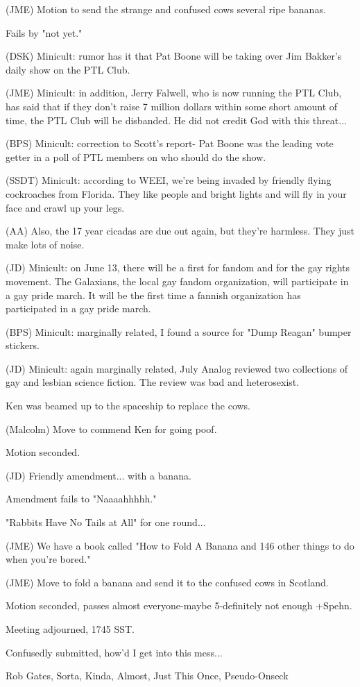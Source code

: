 \documentclass[12pt]{article}
\begin{document}
(JME) Motion to send the strange and confused cows several ripe bananas.

Fails by "not yet."

(DSK) Minicult: rumor has it that Pat Boone will be taking over Jim Bakker's daily show on the PTL Club.

(JME) Minicult: in addition, Jerry Falwell, who is now running the PTL Club, has said that if they don't raise 7 million dollars within some short amount of time, the PTL Club will be disbanded. He did not credit God with this threat...

(BPS) Minicult: correction to Scott's report- Pat Boone was the leading vote getter in a poll of PTL members on who should do the show.

(SSDT) Minicult: according to WEEI, we're being invaded by friendly flying cockroaches from Florida. They like people and bright lights and will fly in your face and crawl up your legs.

(AA) Also, the 17 year cicadas are due out again, but they're harmless. They just make lots of noise.

(JD) Minicult: on June 13, there will be a first for fandom and for the gay rights movement. The Galaxians, the local gay fandom organization, will participate in a gay pride march. It will be the first time a fannish organization has participated in a gay pride march.

(BPS) Minicult: marginally related, I found a source for "Dump Reagan" bumper stickers.

(JD) Minicult: again marginally related, July Analog reviewed two collections of gay and lesbian science fiction. The review was bad and heterosexist.

Ken was beamed up to the spaceship to replace the cows.

(Malcolm) Move to commend Ken for going poof.

Motion seconded.

(JD) Friendly amendment... with a banana.

Amendment fails to "Naaaahhhhh."

"Rabbits Have No Tails at All" for one round...

(JME) We have a book called "How to Fold A Banana and 146 other things to do when you're bored."

(JME) Move to fold a banana and send it to the confused cows in Scotland.

Motion seconded, passes almost everyone-maybe 5-definitely not enough +Spehn.

\vspace{12pt}

\noindent
Meeting adjourned, 1745 SST.

\vspace{18pt}

\centerline{Confusedly submitted, how'd I get into this mess...}
\centerline{Rob Gates, Sorta, Kinda, Almost, Just This Once, Pseudo-Onseck}
\end{document}
